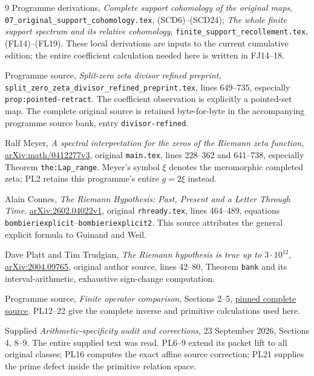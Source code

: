 \documentclass[11pt,a4paper]{article}
\theoremstyle{definition}\newtheorem{definition}[theorem]{Definition}
\begin{document}
\begin{thebibliography}{9}
 Programme derivations,
\emph{Complete support cohomology of the original maps},
\texttt{07\_original\_support\_cohomology.tex}, (SCD6)--(SCD24);
\emph{The whole finite support spectrum and its relative cohomology},
\texttt{finite\_support\_recollement.tex}, (FL14)--(FL19).
These local derivations are inputs to the current cumulative edition;
the entire coefficient calculation needed here is written in FJ14--18.

 Programme source,
\emph{Split-zero zeta divisor refined preprint},
\texttt{split\_zero\_zeta\_divisor\_refined\_preprint.tex},
lines 649--735, especially \texttt{prop:pointed-retract}.
The coefficient observation is explicitly a pointed-set map. The complete original source is retained byte-for-byte in the accompanying programme source bank, entry \texttt{divisor-refined}.

 Ralf Meyer, \emph{A spectral interpretation for the
zeros of the Riemann zeta function},
\href{https://arxiv.org/abs/math/0412277}{arXiv:math/0412277v3},
original \texttt{main.tex}, lines 228--362 and 641--738,
especially Theorem \texttt{the:Lap\_range}.
Meyer's symbol \(\xi\) denotes the meromorphic completed zeta;
PL2 retains this programme's entire \(g=2\xi\) instead.

 Alain Connes, \emph{The Riemann Hypothesis: Past,
Present and a Letter Through Time},
\href{https://arxiv.org/abs/2602.04022}{arXiv:2602.04022v1},
original \texttt{rhready.tex}, lines 464--489,
equations \texttt{bombieriexplicit}--\texttt{bombieriexplicit2}.
This source attributes the general explicit formula to
Guinand and Weil.

 Dave Platt and Tim Trudgian,
\emph{The Riemann hypothesis is true up to \(3\cdot10^{12}\)},
\href{https://arxiv.org/abs/2004.09765}{arXiv:2004.09765},
original author source, lines 42--80, Theorem \texttt{bank}
and its interval-arithmetic, exhaustive sign-change computation.

 Programme source, \emph{Finite operator comparison},
Sections 2--5,
\href{https://github.com/KokunoYumeto/zeta-function-research-reader/blob/4ba9285b66af58a6d58fc502a494c1fb45ca5b79/workbenches/tau-base-cohomology/FINITE_OPERATOR_COMPARISON.md}{pinned complete source}.
PL12--22 give the complete inverse and primitive calculations used here.

 Supplied \emph{Arithmetic-specificity audit and corrections},
23 September 2026, Sections 4, 8--9. The entire supplied text was read.
PL6--9 extend its packet lift to all original classes; PL16 computes
the exact affine source correction; PL21 supplies the prime defect
inside the primitive relation space.


\end{thebibliography}
\end{document}
